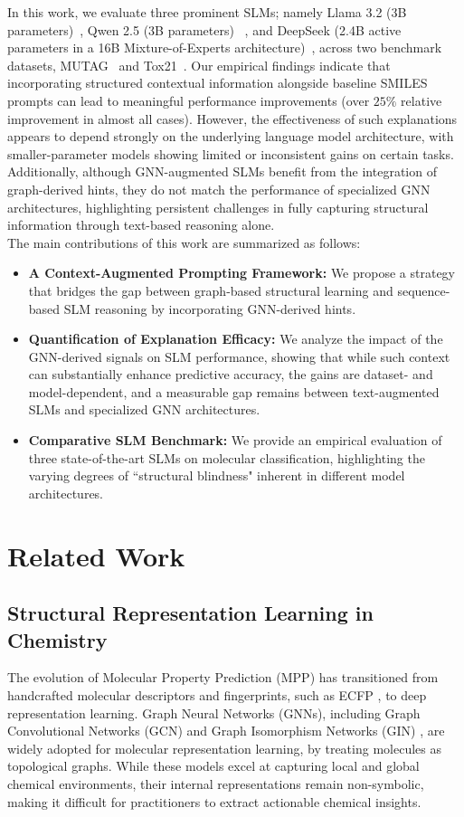 \documentclass[
]{ceurart}
\begin{document}
\noindent In this work, we evaluate three prominent SLMs; namely Llama 3.2 (3B parameters)~\cite{llama}, Qwen 2.5 (3B parameters) ~\cite{qwen2.5}, and DeepSeek (2.4B active parameters in a 16B Mixture-of-Experts architecture)~\cite{deepseek}, across two benchmark datasets, MUTAG~\cite{mutag} and Tox21~\cite{tox21}. Our empirical findings indicate that incorporating structured contextual information alongside baseline SMILES prompts can lead to meaningful performance improvements (over $25\%$ relative improvement in almost all cases). However, the effectiveness of such explanations appears to depend strongly on the underlying language model architecture, with smaller-parameter models showing limited or inconsistent gains on certain tasks. Additionally, although GNN-augmented SLMs benefit from the integration of graph-derived hints, they do not match the performance of specialized GNN architectures, highlighting persistent challenges in fully capturing structural information through text-based reasoning alone.\\
The main contributions of this work are summarized as follows:
\begin{itemize}
    \item \textbf{A Context-Augmented Prompting Framework:} We propose a strategy that bridges the gap between graph-based structural learning and sequence-based SLM reasoning by incorporating GNN-derived hints.
    \item \textbf{Quantification of Explanation Efficacy:} We analyze the impact of the GNN-derived signals on SLM performance, showing that while such context can substantially enhance predictive accuracy, the gains are dataset- and model-dependent, and a measurable gap remains between text-augmented SLMs and specialized GNN architectures.
   \item \textbf{Comparative SLM Benchmark:} We provide an empirical evaluation of three state-of-the-art SLMs on molecular classification, highlighting the varying degrees of ``structural blindness" inherent in different model architectures.
\end{itemize}


\section{Related Work}
\label{sec:related_work}

\subsection{Structural Representation Learning in Chemistry}
The evolution of Molecular Property Prediction (MPP) has transitioned from handcrafted molecular descriptors and fingerprints, such as ECFP \cite{Rogers2010}, to deep representation learning. Graph Neural Networks (GNNs), including Graph Convolutional Networks (GCN) \cite{gcn} and Graph Isomorphism Networks (GIN) \cite{Xu2019}, are widely adopted for molecular representation learning, by treating molecules as topological graphs. While these models excel at capturing local and global chemical environments, their internal representations remain non-symbolic, making it difficult for practitioners to extract actionable chemical insights.
\end{document}
